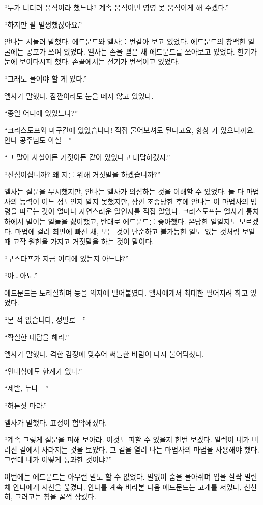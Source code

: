 ``누가 너더러 움직이라 했느냐? 계속 움직이면 영영 못 움직이게 해 주겠다.''

``하지만 팔 멀쩡했잖아요.''

안나는 서둘러 말했다. 에드문드와 엘사를 번갈아 보고 있었다. 에드문드의 창백한 얼굴에는 공포가 쓰여 있었다. 엘사는 손을 뻗은 채 에드문드를 쏘아보고 있었다. 한기가 눈에 보이다시피 했다. 손끝에서는 전기가 번쩍이고 있었다.

``그래도 물어야 할 게 있다.''

엘사가 말했다. 잠깐이라도 눈을 떼지 않고 있었다.

``종일 어디에 있었느냐?''

``크리스토프와 마구간에 있었습니다! 직접 물어보셔도 된다고요, 항상 가 있으니까요. 안나 공주님도 아실—''

``그 말이 사실이든 거짓이든 같이 있었다고 대답하겠지.''

``진심이십니까? 왜 저를 위해 거짓말을 하겠습니까?''

엘사는 질문을 무시했지만, 안나는 엘사가 의심하는 것을 이해할 수 있었다. 둘 다 마법사의 능력이 어느 정도인지 알지 못했지만, 잠깐 조종당한 후에 안나는 이 마법사의 명령을 따르는 것이 얼마나 자연스러운 일인지를 직접 알았다. 크리스토프는 엘사가 통치하에서 벌이는 일들을 싫어했고, 반대로 에드문드를 좋아했다. 온당한 일일지도 모르겠다. 마법에 걸려 최면에 빠진 채, 모든 것이 단순하고 불가능한 일도 없는 것처럼 보일 때 고작 원한을 가지고 거짓말을 하는 것이 말이다.

``구스타프가 지금 어디에 있는지 아느냐?''

``아\ldots\,아뇨.''

에드문드는 도리질하며 등을 의자에 밀어붙였다. 엘사에게서 최대한 떨어지려 하고 있었다.

``본 적 없습니다, 정말로—''

``확실한 대답을 해라.''

엘사가 말했다. 격한 감정에 맞추어 써늘한 바람이 다시 불어닥쳤다.

``인내심에도 한계가 있다.''

``제발, 누나—''

``허튼짓 마라.''

엘사가 말했다. 표정이 험악해졌다.

``계속 그렇게 질문을 피해 보아라. 이것도 피할 수 있을지 한번 보겠다. 알렉이 네가 버려진 길에서 사라지는 것을 보았다. 그 길을 열려 나는 마법사의 마법을 사용해야 했다. 그런데 네가 어떻게 통과한 것이냐?''

이번에는 에드문드는 아무런 말도 할 수 없었다. 말없이 숨을 몰아쉬며 입을 살짝 벌린 채 안나에게 시선을 옮겼다. 안나를 계속 바라본 다음 에드문드는 고개를 저었다, 천천히, 그러고는 침을 꿀꺽 삼켰다.

